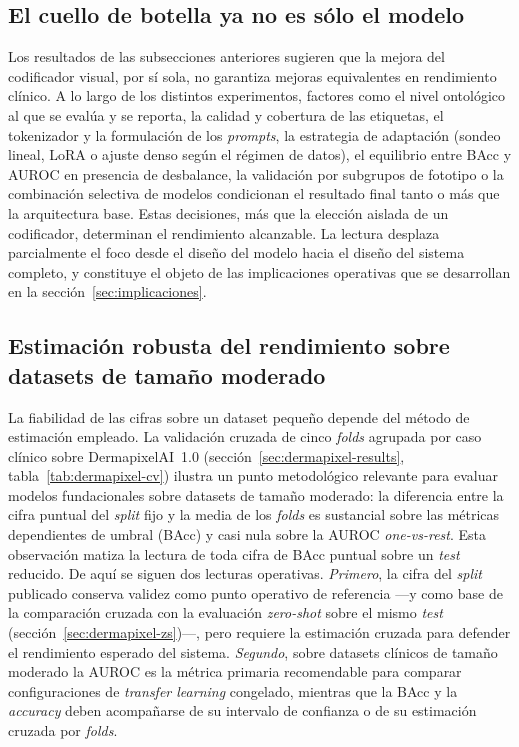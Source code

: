 \subsection{El cuello de botella ya no es sólo el modelo}
\label{sec:disc-cuello-botella}

Los resultados de las subsecciones anteriores sugieren que la mejora
del codificador visual, por sí sola, no garantiza mejoras equivalentes
en rendimiento clínico. A lo largo de los distintos experimentos,
factores como el nivel ontológico al que se evalúa y se reporta, la
calidad y cobertura de las etiquetas, el tokenizador y la formulación
de los \emph{prompts}, la estrategia de adaptación (sondeo lineal,
LoRA o ajuste denso según el régimen de datos), el equilibrio entre
BAcc y AUROC en presencia de desbalance, la validación por subgrupos
de fototipo o la combinación selectiva de modelos condicionan el
resultado final tanto o más que la arquitectura base. Estas
decisiones, más que la elección aislada de un codificador, determinan
el rendimiento alcanzable. La lectura desplaza parcialmente el foco
desde el diseño del modelo hacia el diseño del sistema completo, y
constituye el objeto de las implicaciones operativas que se desarrollan
en la sección~\ref{sec:implicaciones}.

\subsection{Estimación robusta del rendimiento sobre datasets de tamaño moderado}
\label{sec:disc-cv-robustez}

La fiabilidad de las cifras sobre un dataset pequeño depende del método de
estimación empleado. La validación cruzada de cinco \emph{folds} agrupada
por caso clínico sobre DermapixelAI~1.0
(sección~\ref{sec:dermapixel-results}, tabla~\ref{tab:dermapixel-cv})
ilustra un punto metodológico relevante para evaluar modelos
fundacionales sobre datasets de tamaño moderado: la diferencia entre la
cifra puntual del \emph{split} fijo y la media de los \emph{folds} es
sustancial sobre las métricas dependientes de umbral (BAcc) y casi nula
sobre la AUROC \emph{one-vs-rest}. Esta observación matiza la lectura de
toda cifra de BAcc puntual sobre un \emph{test} reducido. De aquí se siguen
dos lecturas operativas. \textit{Primero}, la cifra del \emph{split}
publicado conserva validez como punto operativo de referencia ---y como
base de la comparación cruzada con la evaluación \emph{zero-shot} sobre el
mismo \emph{test} (sección~\ref{sec:dermapixel-zs})---, pero requiere la
estimación cruzada para defender el rendimiento esperado del sistema.
\textit{Segundo}, sobre datasets clínicos de tamaño moderado la AUROC es la
métrica primaria recomendable para comparar configuraciones de
\emph{transfer learning} congelado, mientras que la BAcc y la
\emph{accuracy} deben acompañarse de su intervalo de confianza o de su
estimación cruzada por \emph{folds}.

